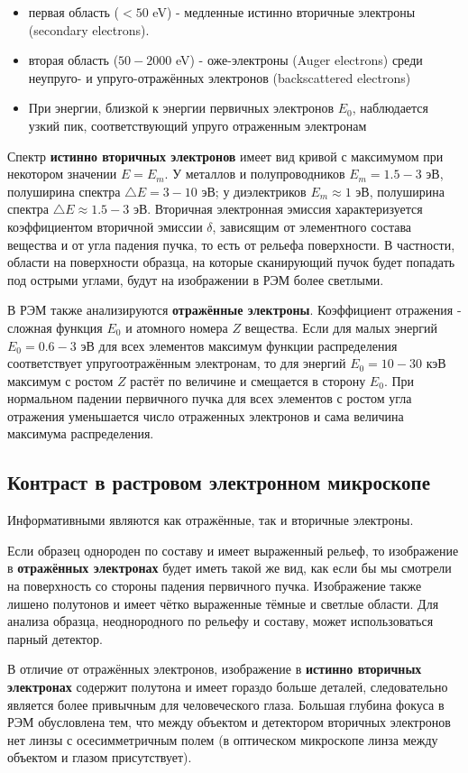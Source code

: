 \documentclass[a4paper]{article}
\begin{document}
\begin{itemize}
    \item первая область ($<50$ eV) - медленные истинно вторичные электроны (secondary electrons).
    \item вторая область ($50 - 2000$ eV) - оже-электроны (Auger electrons) среди неупруго- и упруго-отражённых электронов (backscattered electrons)
    \item При энергии, близкой к энергии первичных электронов $E_0$, наблюдается узкий пик, соответствующий упруго отраженным электронам
\end{itemize}
Спектр \textbf{истинно вторичных электронов} имеет вид кривой с максимумом при некотором значении $E = E_m$. У металлов и полупроводников $E_m = 1.5 - 3$ эВ, полуширина спектра $\triangle E = 3 - 10$ эВ; у диэлектриков $E_m \approx 1$ эВ, полуширина спектра $\triangle E \approx 1.5 - 3$ эВ. Вторичная электронная эмиссия характеризуется коэффициентом вторичной эмиссии $\delta$, зависящим от элементного состава вещества и от угла падения пучка, то есть от рельефа поверхности. В частности, области на поверхности образца, на которые сканирующий пучок будет попадать под острыми углами, будут на изображении в РЭМ более светлыми. \par
В РЭМ также анализируются \textbf{отражённые электроны}. Коэффициент отражения - сложная функция $E_0$ и атомного номера $Z$ вещества. Если для малых энергий $E_0 = 0.6 - 3$ эВ для всех элементов максимум функции распределения соответствует упругоотражённым электронам, то для энергий $E_0 = 10 - 30$ кэВ максимум с ростом $Z$ растёт по величине и смещается в сторону $E_0$. При нормальном падении первичного пучка для всех элементов с ростом угла отражения уменьшается число отраженных электронов и сама величина максимума распределения.
\subsection{Контраст в растровом электронном микроскопе}
Информативными являются как отражённые, так и вторичные электроны. \par
Если образец однороден по составу и имеет выраженный рельеф, то изображение в \textbf{отражённых электронах} будет иметь такой же вид, как если бы мы смотрели на поверхность со стороны падения первичного пучка. Изображение также лишено полутонов и имеет чётко выраженные тёмные и светлые области. Для анализа образца, неоднородного по рельефу и составу, может использоваться парный детектор. \par
В отличие от отражённых электронов, изображение в \textbf{истинно вторичных электронах} содержит полутона и имеет гораздо больше деталей, следовательно является более привычным для человеческого глаза. Большая глубина фокуса в РЭМ обусловлена тем, что между объектом и детектором вторичных электронов нет линзы с осесимметричным полем (в оптическом микроскопе линза между объектом и глазом присутствует).
\end{document}
